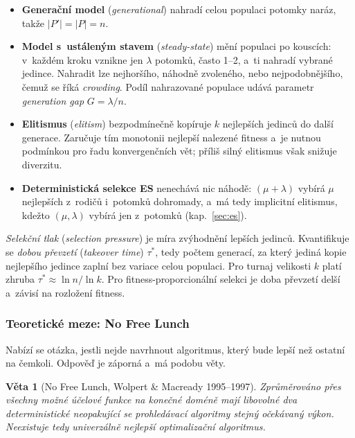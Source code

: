 \documentclass[11pt,a4paper]{article}
\newtheorem{veta}{Věta}[section]
\theoremstyle{definition}
\begin{document}
\begin{itemize}
\item \textbf{Generační model} (\emph{generational}) nahradí celou populaci
  potomky naráz, takže $|P'| = |P| = n$.
\item \textbf{Model s~ustáleným stavem} (\emph{steady-state}) mění populaci po
  kouscích: v~každém kroku vznikne jen $\lambda$ potomků, často 1--2, a~ti nahradí
  vybrané jedince. Nahradit lze nejhoršího, náhodně zvoleného, nebo nejpodobnějšího,
  čemuž se říká \emph{crowding}. Podíl nahrazované populace udává parametr
  \emph{generation gap} $G = \lambda/n$.
\item \textbf{Elitismus} (\emph{elitism}) bezpodmínečně kopíruje $k$ nejlepších
  jedinců do další generace. Zaručuje tím monotonii nejlepší nalezené fitness a~je
  nutnou podmínkou pro řadu konvergenčních vět; příliš silný elitismus však snižuje
  diverzitu.
\item \textbf{Deterministická selekce ES} nenechává nic náhodě: $(\mu+\lambda)$
  vybírá $\mu$ nejlepších z~rodičů i~potomků dohromady, a~má tedy implicitní
  elitismus, kdežto $(\mu,\lambda)$ vybírá jen z~potomků (kap.~\ref{sec:es}).
\end{itemize}

\begin{defbox}
\emph{Selekční tlak} (\emph{selection pressure}) je míra zvýhodnění lepších
jedinců. Kvantifikuje se \emph{dobou převzetí} (\emph{takeover time}) $\tau^*$, tedy
počtem generací, za který jediná kopie nejlepšího jedince zaplní bez variace
celou populaci. Pro turnaj velikosti $k$ platí zhruba
$\tau^* \approx \ln n/\ln k$. Pro fitness-proporcionální selekci je doba převzetí
delší a~závisí na rozložení fitness.
\end{defbox}

\subsubsection{Teoretické meze: No Free Lunch}

Nabízí se otázka, jestli nejde navrhnout algoritmus, který bude lepší než ostatní na
čemkoli. Odpověď je záporná a~má podobu věty.

\begin{veta}[No Free Lunch, Wolpert \& Macready 1995--1997]
Zprůměrováno přes \emph{všechny} možné účelové funkce na konečné doméně mají
libovolné dva deterministické neopakující se prohledávací algoritmy stejný
očekávaný výkon. Neexistuje tedy univerzálně nejlepší optimalizační algoritmus.
\end{veta}
\end{document}
